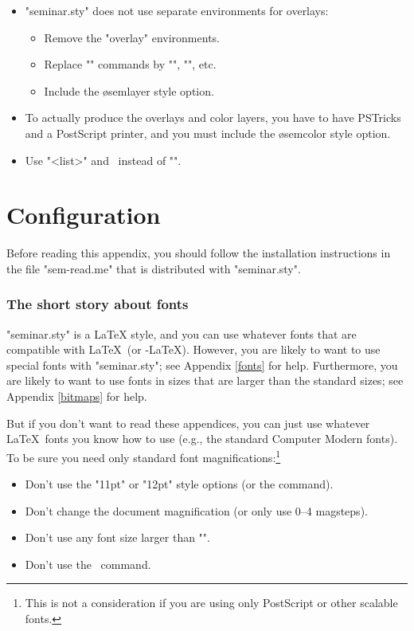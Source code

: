 \begin{slide}
\begin{itemize}
  \item "seminar.sty" does not use separate environments for overlays:
  \begin{itemize}
    \item Remove the "overlay" environments.
    \item Replace "\invisible" commands by "", "", etc.
    \item Include the \o{semlayer} style option.
  \end{itemize}

  \item To actually produce the overlays and color layers, you have to have
PSTricks and a PostScript printer, and you must include the \o{semcolor} style
option.

  \item Use \n\onlyslides"{<list>}" and \n\onlynotestoo\ instead of
"\onlynotes".
\end{itemize}


\begingroup
\def\addcontentsline#1#2#3{}%
\def\thepart{Appendices:}
\part{Configuration}
\endgroup
\begingroup
\def\thepart{}
\addcontentsline{toc}{part}{Appendices:\hspace{1em}Configuration}
\endgroup
\appendix

Before reading this appendix, you should follow the installation instructions
in the file "sem-read.me" that is distributed with "seminar.sty".

\section{The short story about fonts}\label{short-fonts}

"seminar.sty" is a \LaTeX{} style, and you can use whatever fonts that are
compatible with \LaTeX\ (or \AmS-\LaTeX). However, you are likely to want to
use special fonts with "seminar.sty"; see Appendix \ref{fonts} for help.
Furthermore, you are likely to want to use fonts in sizes that are larger than
the standard sizes; see Appendix \ref{bitmaps} for help.

But if you don't want to read these appendices, you can just use whatever
\LaTeX\ fonts you know how to use (e.g., the standard Computer Modern fonts).
To be sure you need only standard font magnifications:\footnote{This is not a
consideration if you are using only PostScript or other scalable fonts.}
\begin{itemize}\label{font-res}
  \item Don't use the "11pt" or "12pt" style options  (or the \n\ptsize{}
command).
  \item Don't change the document magnification (or only use 0--4 magsteps).
  \item Don't use any font size larger than "\large".
  \item Don't use the \n\twoup\ command.
\end{itemize}


\end{slide}
